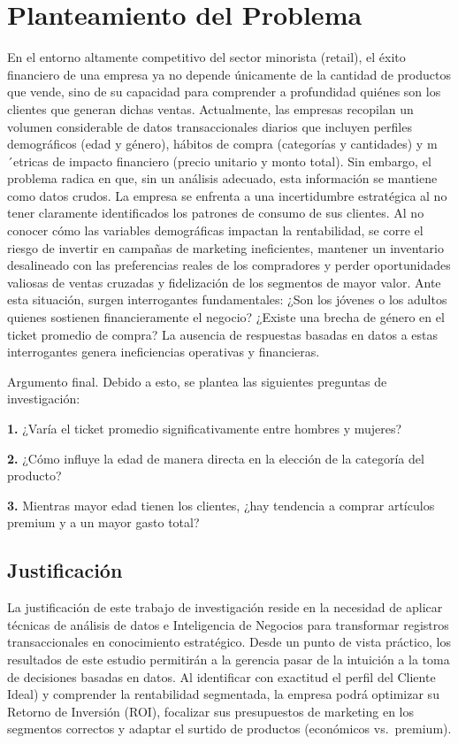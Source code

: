 \documentclass[oneside,11pt]{Latex/Classes/PhDthesisPSnPDF}
\begin{document}
\chapter{Planteamiento del Problema}

En el entorno altamente competitivo del sector minorista (retail), el
éxito financiero de una empresa ya no depende únicamente de la cantidad
de productos que vende, sino de su capacidad para comprender a
profundidad quiénes son los clientes que generan dichas ventas.
Actualmente, las empresas recopilan un volumen considerable de datos
transaccionales diarios que incluyen perfiles demográficos (edad y
género), hábitos de compra (categorías y cantidades) y m´etricas de
impacto financiero (precio unitario y monto total). Sin embargo, el
problema radica en que, sin un análisis adecuado, esta información se
mantiene como datos crudos. La empresa se enfrenta a una incertidumbre
estratégica al no tener claramente identificados los patrones de consumo
de sus clientes. Al no conocer cómo las variables demográficas impactan
la rentabilidad, se corre el riesgo de invertir en campañas de marketing
ineficientes, mantener un inventario desalineado con las preferencias
reales de los compradores y perder oportunidades valiosas de ventas
cruzadas y fidelización de los segmentos de mayor valor. Ante esta
situación, surgen interrogantes fundamentales: ¿Son los jóvenes o los
adultos quienes sostienen financieramente el negocio? ¿Existe una brecha
de género en el ticket promedio de compra? La ausencia de respuestas
basadas en datos a estas interrogantes genera ineficiencias operativas y
financieras.

Argumento final. Debido a esto, se plantea las siguientes preguntas de
investigación:

\textbf{1.} ¿Varía el ticket promedio significativamente entre hombres y
mujeres?

\textbf{2.} ¿Cómo influye la edad de manera directa en la elección de la
categoría del producto?

\textbf{3.} Mientras mayor edad tienen los clientes, ¿hay tendencia a
comprar artículos premium y a un mayor gasto total?

\section{Justificación}

La justificación de este trabajo de investigación reside en la necesidad
de aplicar técnicas de análisis de datos e Inteligencia de Negocios para
transformar registros transaccionales en conocimiento estratégico. Desde
un punto de vista práctico, los resultados de este estudio permitirán a
la gerencia pasar de la intuición a la toma de decisiones basadas en
datos. Al identificar con exactitud el perfil del Cliente Ideal) y
comprender la rentabilidad segmentada, la empresa podrá optimizar su
Retorno de Inversión (ROI), focalizar sus presupuestos de marketing en
los segmentos correctos y adaptar el surtido de productos (económicos
vs.~premium).
\end{document}

